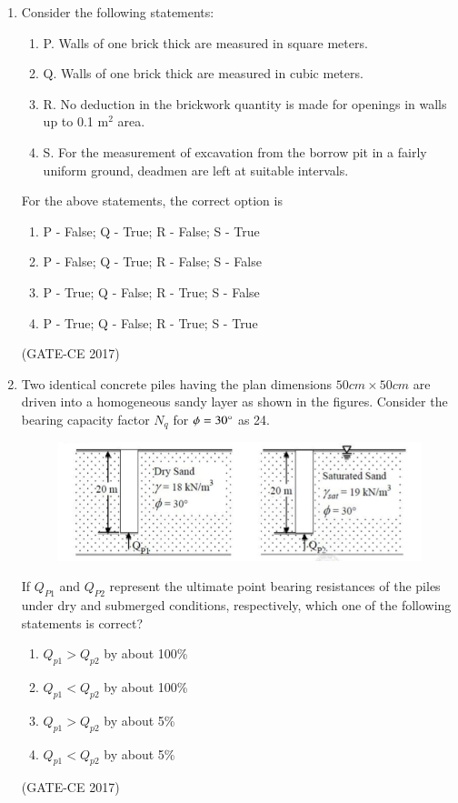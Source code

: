 \documentclass[journal,12pt,onecolumn]{article}
\theoremstyle{remark}
\begin{document}
\begin{enumerate}
    \item Consider the following statements:
    \begin{enumerate}
        \item P. Walls of one brick thick are measured in square meters. 
        \item Q. Walls of one brick thick are measured in cubic meters.  
        \item R. No deduction in the brickwork quantity is made for openings in walls up to 0.1 m$^2$ area.  
        \item S. For the measurement of excavation from the borrow pit in a fairly uniform ground, deadmen are left at suitable intervals.
    \end{enumerate}
    For the above statements, the correct option is
    \begin{enumerate}
        \item P - False; Q - True; R - False; S - True  
        \item P - False; Q - True; R - False; S - False  
        \item P - True; Q - False; R - True; S - False  
        \item P - True; Q - False; R - True; S - True  
    \end{enumerate}
    \hfill (GATE-CE 2017)

    \item Two identical concrete piles having the plan dimensions $ 50cm \times 50cm $ are driven into a homogeneous sandy layer as shown in the figures. Consider the bearing capacity factor $ N_q $ for $ \phi = 30\degree $ as 24.
    \begin{figure}[H]
    \centering
    \includegraphics[width=0.7\columnwidth]{figs/q34.jpg}  
    \caption{}
    \label{fig:9}
    \end{figure}
    If $ Q_{P1} $ and $ Q_{P2} $ represent the ultimate point bearing resistances of the piles under dry and submerged conditions, respectively, which one of the following statements is correct?
    \begin{enumerate}
        \item $ Q_{p1} > Q_{p2} $ by about 100\%  
        \item $ Q_{p1} < Q_{p2} $ by about 100\%  
        \item $ Q_{p1} > Q_{p2} $ by about 5\%  
        \item $ Q_{p1} < Q_{p2} $ by about 5\%  
    \end{enumerate}
    \hfill (GATE-CE 2017)


\end{enumerate}
\end{document}
